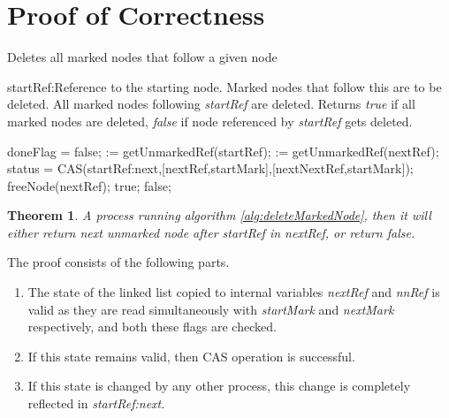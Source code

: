 \documentclass[11pt,onecolumn]{IEEEtran}
\newtheorem {theorem}{Theorem}
\begin{document}
\section{Proof of Correctness}
\begin{algorithm}
  \caption{Deletes all marked nodes that follow a given node}
  \label{alg:deleteMarkedNode}
  
  \begin{algorithmic}[1]
    \Require
        \Statex startRef:Reference to the starting node. Marked nodes
                that follow this are to be deleted. 
    \Ensure
       \Statex All marked nodes following {\it startRef} are deleted.
       \Statex Returns {\it true} if all marked nodes are deleted,
               {\it false} if node referenced by {\it startRef} gets deleted.  

    \Statex   
      \State doneFlag = false;
         := getUnmarkedRef(startRef);
           := getUnmarkedRef(nextRef);
            \State status = CAS(startRef:next,[nextRef,startMark],[nextNextRef,startMark]);
               \State freeNode(nextRef);
            \EndIf
          \Else
            \State
            \Return true;
          \EndIf
        \Else{}
          \State
          \Return false;  
        \EndIf
      \EndWhile        
    \EndFunction
  \end{algorithmic}
\end{algorithm}

\begin{theorem}
  A process running algorithm \ref{alg:deleteMarkedNode}, then it will either return next unmarked node after {\it startRef} in {\it nextRef}, or return {\it false}.
\end{theorem}
\begin{IEEEproof}
  The proof consists of the following parts.
  \begin{enumerate}
    \item The state of the linked list copied to internal variables {\it nextRef} and {\it nnRef} is valid as they are read simultaneously with {\it startMark} and {\it nextMark} respectively, and both these flags are checked.
    \item If this state remains valid, then CAS operation is successful.
    \item If this state is changed by any other process, this change is completely reflected in {\it startRef:next}.  
\end{enumerate} 
\end{IEEEproof}
\end{document}
